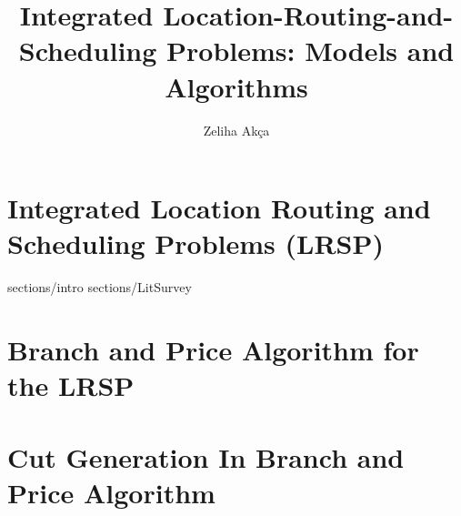 \documentclass[11pt]{report}
\begin{document}
\title {Integrated Location-Routing-and-Scheduling Problems: Models and Algorithms}
\author {Zeliha Ak\c ca}


 \copyrightfalse




\beforepreface



\newpage

 \afterpreface




\newpage

\chapter{Integrated Location Routing and Scheduling Problems (LRSP)}

 {sections/intro}
\pagebreak
 {sections/LitSurvey}
\pagebreak


\pagebreak

\chapter{Branch and Price Algorithm for the LRSP}


%

%

%



\chapter{Cut Generation In Branch and Price Algorithm }
\end{document}
